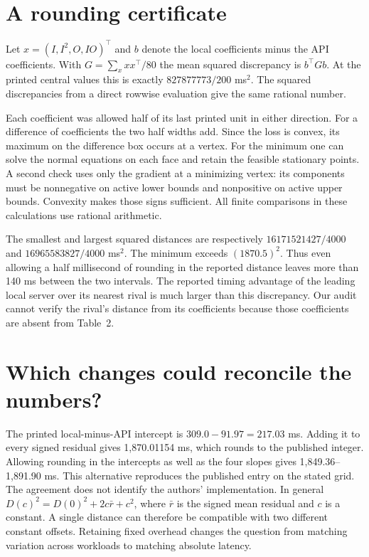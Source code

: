 \documentclass[11pt]{article}
\begin{document}
\section{A rounding certificate}
Let $x=(I,I^2,O,IO)^\top$ and $b$ denote the local coefficients minus the API coefficients. With $G=\sum_x xx^\top/80$ the mean squared discrepancy is $b^\top G b$. At the printed central values this is exactly $827877773/200$ ms$^2$. The squared discrepancies from a direct rowwise evaluation give the same rational number.

Each coefficient was allowed half of its last printed unit in either direction. For a difference of coefficients the two half widths add. Since the loss is convex, its maximum on the difference box occurs at a vertex. For the minimum one can solve the normal equations on each face and retain the feasible stationary points. A second check uses only the gradient at a minimizing vertex: its components must be nonnegative on active lower bounds and nonpositive on active upper bounds. Convexity makes those signs sufficient. All finite comparisons in these calculations use rational arithmetic.

The smallest and largest squared distances are respectively $16171521427/4000$ and $16965583827/4000$ ms$^2$. The minimum exceeds $(1870.5)^2$. Thus even allowing a half millisecond of rounding in the reported distance leaves more than 140 ms between the two intervals. The reported timing advantage of the leading local server over its nearest rival is much larger than this discrepancy. Our audit cannot verify the rival's distance from its coefficients because those coefficients are absent from Table~2.

\section{Which changes could reconcile the numbers?}
The printed local-minus-API intercept is $309.0-91.97=217.03$ ms. Adding it to every signed residual gives 1,870.01154 ms, which rounds to the published integer. Allowing rounding in the intercepts as well as the four slopes gives 1,849.36--1,891.90 ms. This alternative reproduces the published entry on the stated grid. The agreement does not identify the authors' implementation. In general $D(c)^2=D(0)^2+2c\bar r+c^2$, where $\bar r$ is the signed mean residual and $c$ is a constant. A single distance can therefore be compatible with two different constant offsets. Retaining fixed overhead changes the question from matching variation across workloads to matching absolute latency.
\end{document}
